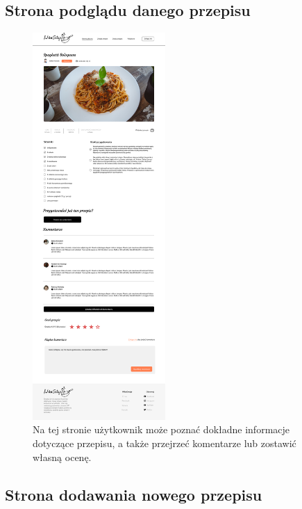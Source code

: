 \documentclass{article}
\begin{document}
\newpage

\subsection{Strona podglądu danego przepisu}
\begin{figure}[H]
    \begin{center}
        \includegraphics[width=0.45\textwidth]{mockups/recipe_preview}
    \end{center}
    \caption{Na tej stronie użytkownik może poznać dokładne informacje dotyczące przepisu, a także przejrzeć komentarze lub zostawić własną ocenę.}
\end{figure}

\newpage

\subsection{Strona dodawania nowego przepisu}
\end{document}
